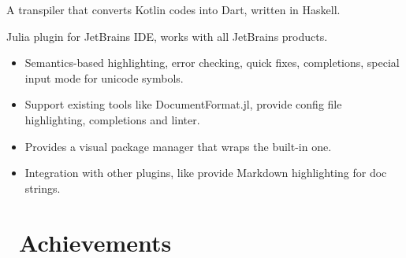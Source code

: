\documentclass{resume}
\begin{document}
A transpiler that converts Kotlin codes into Dart, written in Haskell.

Julia plugin for JetBrains IDE, works with all JetBrains products.
\begin{itemize}
  \item Semantics-based highlighting, error checking, quick fixes, completions, special input mode for unicode symbols.
  \item Support existing tools like DocumentFormat.jl, provide config file highlighting, completions and linter.
  \item Provides a visual package manager that wraps the built-in one.
  \item Integration with other plugins, like provide Markdown highlighting for doc strings.
\end{itemize}


\section{\faHeartO\ Achievements}
\end{document}
